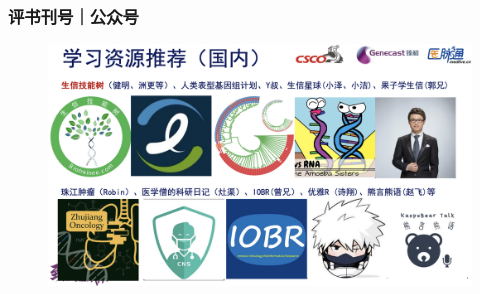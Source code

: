 \documentclass[11pt]{ctexbeamer}
\begin{document}
\begin{frame}
\frametitle{评书刊号｜公众号}
  \begin{figure}
    \centering
    \includegraphics[width=\textwidth]{wechat_01.png}
  \end{figure}
\end{frame}
\end{document}
